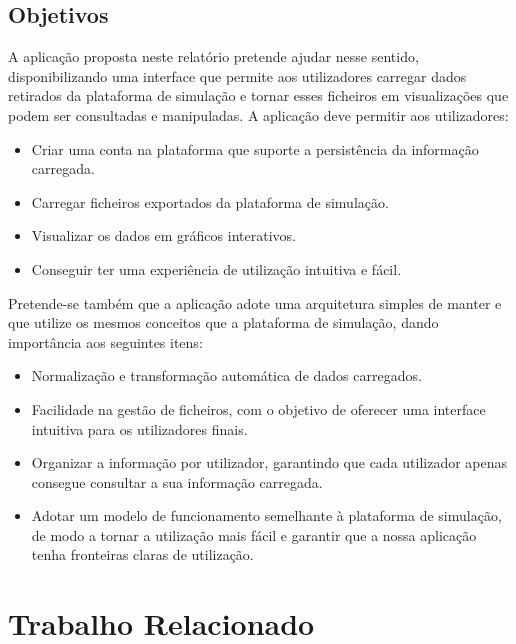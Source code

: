 \section{Objetivos}

A aplicação proposta neste relatório pretende ajudar nesse sentido, disponibilizando uma interface que permite aos utilizadores carregar dados retirados da plataforma de simulação e tornar esses ficheiros em visualizações que podem ser consultadas e manipuladas. A aplicação deve permitir aos utilizadores:

\begin{itemize}
    \item Criar uma conta na plataforma que suporte a persistência da informação carregada.
    \item Carregar ficheiros exportados da plataforma de simulação.
    \item Visualizar os dados em gráficos interativos.
    \item Conseguir ter uma experiência de utilização intuitiva e fácil.
\end{itemize}

Pretende-se também que a aplicação adote uma arquitetura simples de manter e que utilize os mesmos conceitos que a plataforma de simulação, dando importância aos seguintes itens:

\begin{itemize}
    \item Normalização e transformação automática de dados carregados.
    \item Facilidade na gestão de ficheiros, com o objetivo de oferecer uma interface intuitiva para os utilizadores finais.
    \item Organizar a informação por utilizador, garantindo que cada utilizador apenas consegue consultar a sua informação carregada.
    \item Adotar um modelo de funcionamento semelhante à plataforma de simulação, de modo a tornar a utilização mais fácil e garantir que a nossa aplicação tenha fronteiras claras de utilização.
\end{itemize}

\chapter{Trabalho Relacionado}
\label{ch:trabalhoRelacionado}

